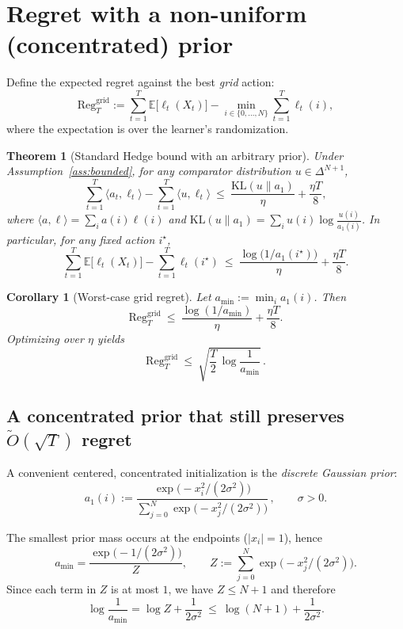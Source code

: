 \documentclass[11pt]{article}
\newtheorem{theorem}{Theorem}
\newtheorem{corollary}{Corollary}
\begin{document}
\section{Regret with a non-uniform (concentrated) prior}

Define the expected regret against the best \emph{grid} action:
\[
    \mathrm{Reg}^{\mathrm{grid}}_T
    := \sum_{t=1}^T \mathbb{E}\big[\ell_t(X_t)\big] - \min_{i\in\{0,\dots,N\}} \sum_{t=1}^T \ell_t(i),
\]
where the expectation is over the learner's randomization.

\begin{theorem}[Standard Hedge bound with an arbitrary prior]\label{thm:hedge-regret}
    Under Assumption~\ref{ass:bounded}, for any comparator distribution $u\in\Delta^{N+1}$,
    \[
        \sum_{t=1}^T \langle a_t,\ell_t\rangle - \sum_{t=1}^T \langle u,\ell_t\rangle
        \ \le\
        \frac{\mathrm{KL}(u\|a_1)}{\eta} + \frac{\eta T}{8},
    \]
    where $\langle a,\ell\rangle=\sum_i a(i)\ell(i)$ and $\mathrm{KL}(u\|a_1)=\sum_i u(i)\log\frac{u(i)}{a_1(i)}$.
    In particular, for any fixed action $i^\star$,
    \[
        \sum_{t=1}^T \mathbb{E}\big[\ell_t(X_t)\big] - \sum_{t=1}^T \ell_t(i^\star)
        \ \le\
        \frac{\log\!\big(1/a_1(i^\star)\big)}{\eta} + \frac{\eta T}{8}.
    \]
\end{theorem}

\begin{corollary}[Worst-case grid regret]\label{cor:worst-grid}
    Let $a_{\min}:=\min_i a_1(i)$. Then
    \[
        \mathrm{Reg}^{\mathrm{grid}}_T \ \le\ \frac{\log(1/a_{\min})}{\eta}+\frac{\eta T}{8}.
    \]
    Optimizing over $\eta$ yields
    \[
        \mathrm{Reg}^{\mathrm{grid}}_T \ \le\ \sqrt{\frac{T}{2}\,\log\!\frac{1}{a_{\min}}}\,.
    \]
\end{corollary}

\subsection{A concentrated prior that still preserves $\widetilde{O}(\sqrt{T})$ regret}

A convenient centered, concentrated initialization is the \emph{discrete Gaussian prior}:
\begin{equation}\label{eq:gaussian-prior}
    a_1(i) := \frac{\exp\!\big(-x_i^2/(2\sigma^2)\big)}{\sum_{j=0}^N \exp\!\big(-x_j^2/(2\sigma^2)\big)}\,,\qquad \sigma>0.
\end{equation}

The smallest prior mass occurs at the endpoints ($|x_i|=1$), hence
\[
    a_{\min} = \frac{\exp\!\big(-1/(2\sigma^2)\big)}{Z},\qquad
    Z:=\sum_{j=0}^N \exp\!\big(-x_j^2/(2\sigma^2)\big).
\]
Since each term in $Z$ is at most $1$, we have $Z\le N+1$ and therefore
\begin{equation}\label{eq:amin-bound}
    \log\frac{1}{a_{\min}}
    = \log Z + \frac{1}{2\sigma^2}
    \ \le\ \log(N+1)+\frac{1}{2\sigma^2}.
\end{equation}
\end{document}
